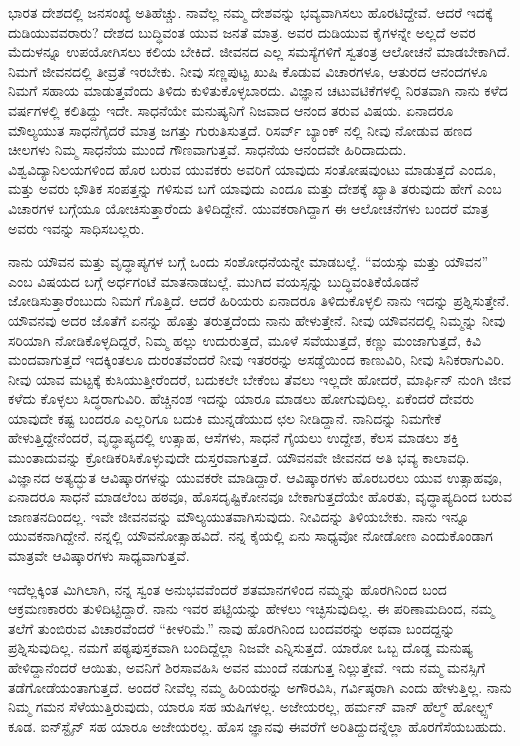 ಭಾರತ ದೇಶದಲ್ಲಿ ಜನಸಂಖ್ಯೆ ಅತಿಹೆಚ್ಚು. ನಾವೆಲ್ಲ ನಮ್ಮ ದೇಶವನ್ನು ಭವ್ಯವಾಗಿಸಲು ಹೊರಟಿದ್ದೇವೆ. ಆದರೆ ಇದಕ್ಕೆ ದುಡಿಯುವವರಾರು? ದೇಶದ ಬುದ್ಧಿವಂತ ಯುವ ಜನತೆ ಮಾತ್ರ. ಅವರ ದುಡಿಯುವ ಕೈಗಳನ್ನೇ ಅಲ್ಲದೆ ಅವರ ಮೆದುಳನ್ನೂ ಉಪಯೋಗಿಸಲು ಕಲಿಯ ಬೇಕಿದೆ. ಜೀವನದ ಎಲ್ಲ ಸಮಸ್ಯೆಗಳಿಗೆ ಸ್ವತಂತ್ರ ಆಲೋಚನೆ ಮಾಡಬೇಕಾಗಿದೆ. ನಿಮಗೆ ಜೀವನದಲ್ಲಿ ತೀವ್ರತೆ ಇರಬೇಕು. ನೀವು ಸಣ್ಣಪುಟ್ಟ ಖುಷಿ ಕೊಡುವ ವಿಚಾರಗಳೂ, ಆತುರದ ಆನಂದಗಳೂ ನಿಮಗೆ ಸಹಾಯ ಮಾಡುತ್ತವೆಂದು ತಿಳಿದು ಕುಳಿತುಕೊಳ್ಳಬಾರದು. ವಿಜ್ಞಾನ ಚಟುವಟಿಕೆಗಳಲ್ಲಿ ನಿರತವಾಗಿ ನಾನು ಕಳೆದ  ವರ್ಷಗಳಲ್ಲಿ ಕಲಿತಿದ್ದು ಇದೇ. ಸಾಧನೆಯೇ ಮನುಷ್ಯನಿಗೆ ನಿಜವಾದ ಆನಂದ ತರುವ ವಿಷಯ. ಏನಾದರೂ ಮೌಲ್ಯಯುತ ಸಾಧನೆಗೈದರೆ ಮಾತ್ರ ಜಗತ್ತು ಗುರುತಿಸುತ್ತದೆ. ರಿಸರ್ವ್ ಬ್ಯಾಂಕ್ ನಲ್ಲಿ ನೀವು ನೋಡುವ ಹಣದ ಚೀಲಗಳು ನಿಮ್ಮ ಸಾಧನೆಯ ಮುಂದೆ ಗೌಣವಾಗುತ್ತವೆ. ಸಾಧನೆಯ ಆನಂದವೇ ಹಿರಿದಾದುದು. ವಿಶ್ವವಿದ್ಯಾನಿಲಯಗಳಿಂದ ಹೊರ ಬರುವ ಯುವಕರು ಅವರಿಗೆ ಯಾವುದು ಸಂತೋಷವುಂಟು ಮಾಡುತ್ತದೆ ಎಂದೂ, ಮತ್ತು ಅವರು ಭೌತಿಕ ಸಂಪತ್ತನ್ನು ಗಳಿಸುವ ಬಗೆ ಯಾವುದು ಎಂದೂ ಮತ್ತು ದೇಶಕ್ಕೆ ಖ್ಯಾತಿ ತರುವುದು ಹೇಗೆ ಎಂಬ ವಿಚಾರಗಳ ಬಗ್ಗೆಯೂ ಯೋಚಿಸುತ್ತಾರೆಂದು ತಿಳಿದಿದ್ದೇನೆ. ಯುವಕರಾಗಿದ್ದಾಗ ಈ ಆಲೋಚನೆಗಳು ಬಂದರೆ ಮಾತ್ರ ಅವರು ಇವನ್ನು ಸಾಧಿಸಬಲ್ಲರು.

ನಾನು ಯೌವನ ಮತ್ತು ವೃದ್ಧಾಪ್ಯಗಳ ಬಗ್ಗೆ ಒಂದು ಸಂಶೋಧನೆಯನ್ನೇ ಮಾಡಬಲ್ಲೆ. “ವಯಸ್ಸು ಮತ್ತು ಯೌವನ” ಎಂಬ ವಿಷಯದ ಬಗ್ಗೆ ಅರ್ಧಗಂಟೆ ಮಾತನಾಡಬಲ್ಲೆ. ಮುಗಿದ ವಯಸ್ಸನ್ನು ಬುದ್ಧಿವಂತಿಕೆಯೊಡನೆ ಜೋಡಿಸುತ್ತಾರೆಂಬುದು ನಿಮಗೆ ಗೊತ್ತಿದೆ. ಆದರೆ ಹಿರಿಯರು ಏನಾದರೂ ತಿಳಿದುಕೊಳ್ಳಲಿ ನಾನು ಇದನ್ನು ಪ್ರಶ್ನಿಸುತ್ತೇನೆ. ಯೌವನವು ಅದರ ಜೊತೆಗೆ ಏನನ್ನು ಹೊತ್ತು ತರುತ್ತದೆಂದು ನಾನು ಹೇಳುತ್ತೇನೆ. ನೀವು ಯೌವನದಲ್ಲಿ ನಿಮ್ಮನ್ನು ನೀವು ಸರಿಯಾಗಿ ನೋಡಿಕೊಳ್ಳದಿದ್ದರೆ, ನಿಮ್ಮ ಹಲ್ಲು ಉದುರುತ್ತದೆ, ಮೂಳೆ ಸವೆಯುತ್ತದೆ, ಕಣ್ಣು ಮಂಜಾಗುತ್ತದೆ, ಕಿವಿ ಮಂದವಾಗುತ್ತದೆ ಇದಕ್ಕಿಂತಲೂ ದುರಂತವೆಂದರೆ ನೀವು ಇತರರನ್ನು ಅಸಡ್ಡೆಯಿಂದ ಕಾಣುವಿರಿ, ನೀವು ಸಿನಿಕರಾಗುವಿರಿ. ನೀವು ಯಾವ ಮಟ್ಟಕ್ಕೆ ಕುಸಿಯುತ್ತೀರೆಂದರೆ, ಬದುಕಲೇ ಬೇಕೆಂಬ ತೆವಲು ಇಲ್ಲದೇ ಹೋದರೆ, ಮಾರ್ಫಿನ್ ನುಂಗಿ ಜೀವ ಕಳೆದು ಕೊಳ್ಳಲು ಸಿದ್ಧರಾಗುವಿರಿ. ಹೆಚ್ಚಿನಂಶ ಇದನ್ನು ಯಾರೂ ಮಾಡಲು ಹೋಗುವುದಿಲ್ಲ. ಏಕೆಂದರೆ ದೇವರು ಯಾವುದೇ ಕಷ್ಟ ಬಂದರೂ ಎಲ್ಲರಿಗೂ ಬದುಕಿ ಮುನ್ನಡೆಯುದ ಛಲ ನೀಡಿದ್ದಾನೆ. ನಾನಿದನ್ನು ನಿಮಗೇಕೆ ಹೇಳುತ್ತಿದ್ದೇನೆಂದರೆ, ವೃದ್ಧಾಪ್ಯದಲ್ಲಿ ಉತ್ಸಾಹ, ಆಸೆಗಳು, ಸಾಧನೆ ಗೈಯಲು ಉದ್ದೇಶ, ಕೆಲಸ ಮಾಡಲು ಶಕ್ತಿ ಮುಂತಾದುವನ್ನು ಕ್ರೋಡಿಕರಿಸಿಕೊಳ್ಳುವುದೇ ದುಸ್ತರವಾಗುತ್ತದೆ. ಯೌವನವೇ ಜೀವನದ ಅತಿ ಭವ್ಯ ಕಾಲಾವಧಿ. ವಿಜ್ಞಾನದ ಅತ್ಯದ್ಭುತ ಆವಿಷ್ಕಾರಗಳನ್ನು ಯುವಕರೇ ಮಾಡಿದ್ದಾರೆ. ಆವಿಷ್ಕಾರಗಳು ಹೊರಬರಲು ಯುವ ಉತ್ಸಾಹವೂ, ಏನಾದರೂ ಸಾಧನೆ ಮಾಡಲೆಂಬ ಹಠವೂ, ಹೊಸದೃಷ್ಟಿಕೋನವೂ ಬೇಕಾಗುತ್ತದೆಯೇ ಹೊರತು, ವೃದ್ಧಾಪ್ಯದಿಂದ ಬರುವ ಜಾಣತನದಿಂದಲ್ಲ. ಇವೇ ಜೀವನವನ್ನು ಮೌಲ್ಯಯುತವಾಗಿಸುವುದು. ನೀವಿದನ್ನು ತಿಳಿಯಬೇಕು. ನಾನು ಇನ್ನೂ ಯುವಕನಾಗಿದ್ದೇನೆ. ನನ್ನಲ್ಲಿ ಯೌವನೋತ್ಸಾಹವಿದೆ. ನನ್ನ ಕೈಯಲ್ಲಿ ಏನು ಸಾಧ್ಯವೋ ನೋಡೋಣ ಎಂದುಕೊಂಡಾಗ ಮಾತ್ರವೇ ಆವಿಷ್ಕಾರಗಳು ಸಾಧ್ಯವಾಗುತ್ತವೆ.



ಇದೆಲ್ಲಕ್ಕಿಂತ ಮಿಗಿಲಾಗಿ, ನನ್ನ ಸ್ವಂತ ಅನುಭವವೆಂದರೆ ಶತಮಾನಗಳಿಂದ ನಮ್ಮನ್ನು ಹೊರಗಿನಿಂದ ಬಂದ ಆಕ್ರಮಣಕಾರರು ತುಳಿದಿಟ್ಟಿದ್ದಾರೆ. ನಾನು ಇವರ ಪಟ್ಟಿಯನ್ನು ಹೇಳಲು ಇಚ್ಛಿಸುವುದಿಲ್ಲ. ಈ ಪರಿಣಾಮದಿಂದ, ನಮ್ಮ ತಲೆಗೆ ತುಂಬಿರುವ ವಿಚಾರವೆಂದರೆ “ಕೀಳರಿಮೆ.” ನಾವು ಹೊರಗಿನಿಂದ ಬಂದವರನ್ನು ಅಥವಾ ಬಂದದ್ದನ್ನು ಪ್ರಶ್ನಿಸುವುದಿಲ್ಲ. ನಮಗೆ ಪಠ್ಯಪುಸ್ತಕವಾಗಿ ಬಂದಿದ್ದೆಲ್ಲಾ ನಿಜವೇ ಎನ್ನಿಸುತ್ತದೆ. ಯಾರೋ ಒಬ್ಬ ದೊಡ್ಡ ಮನುಷ್ಯ ಹೇಳಿದ್ದಾನೆಂದರೆ ಆಯಿತು, ಅವನಿಗೆ ಶಿರಸಾವಹಿಸಿ ಅವನ ಮುಂದೆ ನಡುಗುತ್ತ ನಿಲ್ಲುತ್ತೇವೆ. ಇದು ನಮ್ಮ ಮನಸ್ಸಿಗೆ ತಡೆಗೋಡೆಯಂತಾಗುತ್ತದೆ. ಅಂದರೆ ನೀವೆಲ್ಲ ನಮ್ಮ ಹಿರಿಯರನ್ನು ಅಗೌರವಿಸಿ, ಗರ್ವಿಷ್ಠರಾಗಿ ಎಂದು ಹೇಳುತ್ತಿಲ್ಲ. ನಾನು ನಿಮ್ಮ ಗಮನ ಸೆಳೆಯುತ್ತಿರುವುದು, ಯಾರೂ ಸಹ ಋಷಿಗಳಲ್ಲ. ಅಜೇಯರಲ್ಲ, ಹರ್ಮನ್ ವಾನ್ ಹೆಲ್ಮ್ ‍ಹೋಲ್ಟ್ಸ್ ಕೂಡ. ಐನ್‍ಸ್ಟೈನ್ ಸಹ ಯಾರೂ ಅಜೇಯರಲ್ಲ. ಹೊಸ ಜ್ಞಾನವು ಈವರೆಗೆ ಅರಿತಿದ್ದುದನ್ನೆಲ್ಲಾ ಹೊರಗೆಸೆಯಬಹುದು.

